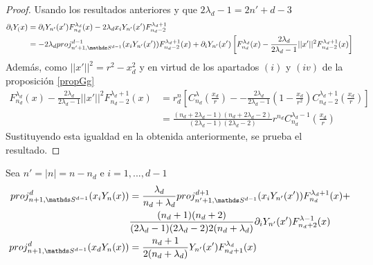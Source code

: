\begin{proof} Usando los resultados anteriores y que $2\lambda_d-1 = 2n'+d-3$
	$$
	\begin{aligned}\partial_i Y_(x) &= \partial_i Y_{n'}(x')F_{n_d}^{\lambda_d}(x)-2\lambda_d x_i Y_{n'}(x')F_{n_d-2}^{\lambda_d+1}\\ &= -2\lambda_d proj_{n'+1,\sphere}^{d-1}(x_iY_{n'}(x'))F_{n_d-2}^{\lambda_d+1}(x) + \partial_iY_{n'}(x')\left[F_{n_d}^{\lambda_d}(x)-\frac{2\lambda_d}{2\lambda_d-1}||x'||^2F_{n_d-2}^{\lambda_d+1}(x)\right]\end{aligned}$$
	Además, como $||x'||^2 = r^2-x_d^2$ y en virtud de los apartados $(i)$ y $(iv)$ de la proposición \ref{propGg}
	$$\begin{aligned}
	F_{n_d}^{\lambda_d}(x) -\frac{2\lambda_d}{2\lambda_d-1}||x'||^2F_{n_d-2}^{\lambda_d+1}(x) &=   r^n_d\left[C_{n_d}^{\lambda}(\frac{x_d}{r}) - -\frac{2\lambda_d}{2\lambda_d-1}(1-\frac{x_d}{r^2})C_{n_d-2}^{\lambda_d+1}(\frac{x_d}{r})\right] \\ &=   \frac{(n_d+2\lambda_d-1)(n_d+2\lambda_d-2)}{(2\lambda_d-1)(2\lambda_d - 2)}r^{n_d}C_{n_d}^{\lambda_d-1}(\frac{x_d}{r})
	\end{aligned}
	$$
	Sustituyendo esta igualdad en la obtenida anteriormente, se prueba el resultado.
\end{proof}
\begin{prop}Sea $n'=|n|=n-n_d$ e $i=1,...,d-1$
	\begin{gather*}
	\begin{aligned}
		proj_{n+1,\sphere}^d(x_iY_n(x)) &= \frac{\lambda_d}{n_d+\lambda_d} proj_{n'+1,\sphere}^{d+1}(x_iY_{n'}(x'))F_{n_d}^{\lambda_d +1}(x)+\\& \frac{(n_d+1)(n_d+2)}{(2\lambda_d-1)(2\lambda_d-2)2(n_d+\lambda_d)}\partial_iY_{n'}(x')F_{n_d+2}^{\lambda-1}(x)\\
		proj_{n+1,\sphere}^d(x_dY_n(x)) &= \frac{n_d+1}{2(n_d+\lambda_d)}Y_{n'}(x')F_{n_d+1}^{\lambda_d}(x)
	\end{aligned}
	\end{gather*}
\end{prop}

